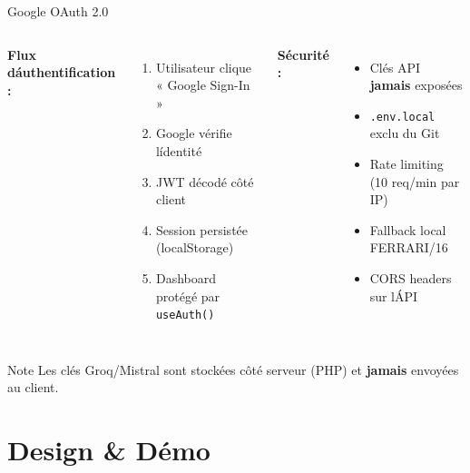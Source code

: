 \documentclass[11pt,aspectratio=169]{beamer}
\begin{document}
\begin{frame}{Google OAuth 2.0}
  \begin{columns}
    \textbf{\textcolor{ferrariRed}{Flux d\'authentification :}} \\[0.2cm]
    \begin{enumerate}
      \item Utilisateur clique « Google Sign-In »
      \item Google v\'erifie l\'identit\'e
      \item JWT d\'ecod\'e c\^ot\'e client
      \item Session persist\'ee (localStorage)
      \item Dashboard prot\'eg\'e par \texttt{useAuth()}
    \end{enumerate}

    \textbf{\textcolor{ferrariRed}{S\'ecurit\'e :}} \\[0.2cm]
    \begin{itemize}
      \item Cl\'es API \textbf{jamais} expos\'ees
      \item \texttt{.env.local} exclu du Git
      \item Rate limiting (10 req/min par IP)
      \item Fallback local FERRARI/16
      \item CORS headers sur l\'API
    \end{itemize}
  \end{columns}

  \vspace{0.4cm}
  \begin{alertblock}{Note}
    Les cl\'es Groq/Mistral sont stock\'ees c\^ot\'e serveur (PHP) et \textbf{jamais} envoy\'ees au client.
  \end{alertblock}
\end{frame}

\section{Design \& D\'emo}
\end{document}
